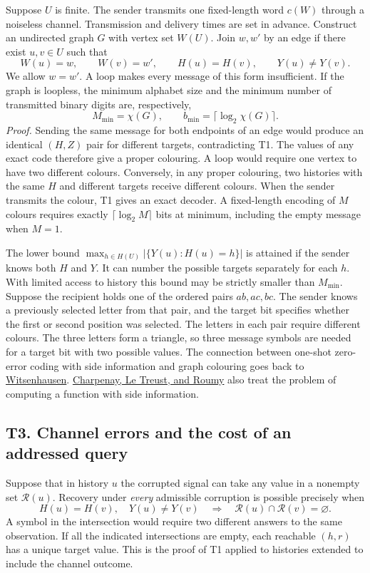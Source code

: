 Suppose $U$ is finite. The sender transmits one fixed-length word $c(W)$ through a noiseless channel. Transmission and delivery times are set in advance. Construct an undirected graph $G$ with vertex set $W(U)$. Join $w,w'$ by an edge if there exist $u,v\in U$ such that
\[
 W(u)=w,\qquad W(v)=w',\qquad H(u)=H(v),\qquad Y(u)\ne Y(v).
\]
We allow $w=w'$. A loop makes every message of this form insufficient. If the graph is loopless, the minimum alphabet size and the minimum number of transmitted binary digits are, respectively,
\[
 M_{\min}=\chi(G),\qquad b_{\min}=\lceil\log_2\chi(G)\rceil .
\]
\emph{Proof.} Sending the same message for both endpoints of an edge would produce an identical $(H,Z)$ pair for different targets, contradicting T1. The values of any exact code therefore give a proper colouring. A loop would require one vertex to have two different colours. Conversely, in any proper colouring, two histories with the same $H$ and different targets receive different colours. When the sender transmits the colour, T1 gives an exact decoder. A fixed-length encoding of $M$ colours requires exactly $\lceil\log_2 M\rceil$ bits at minimum, including the empty message when $M=1$.

The lower bound $\max_{h\in H(U)}|\{Y(u):H(u)=h\}|$ is attained if the sender knows both $H$ and $Y$. It can number the possible targets separately for each $h$. With limited access to history this bound may be strictly smaller than $M_{\min}$. Suppose the recipient holds one of the ordered pairs $ab,ac,bc$. The sender knows a previously selected letter from that pair, and the target bit specifies whether the first or second position was selected. The letters in each pair require different colours. The three letters form a triangle, so three message symbols are needed for a target bit with two possible values. The connection between one-shot zero-error coding with side information and graph colouring goes back to \href{https://doi.org/10.1109/TIT.1976.1055607}{Witsenhausen}. \href{https://doi.org/10.3390/e26040338}{Charpenay, Le Treust, and Roumy} also treat the problem of computing a function with side information.

\subsection{T3. Channel errors and the cost of an addressed query}
\label{thm:observer-t3}

Suppose that in history $u$ the corrupted signal can take any value in a nonempty set $\mathcal R(u)$. Recovery under \emph{every} admissible corruption is possible precisely when
\[
 H(u)=H(v),\quad Y(u)\ne Y(v)
 \quad\Longrightarrow\quad \mathcal R(u)\cap\mathcal R(v)=\varnothing .
\]
A symbol in the intersection would require two different answers to the same observation. If all the indicated intersections are empty, each reachable $(h,r)$ has a unique target value. This is the proof of T1 applied to histories extended to include the channel outcome.

